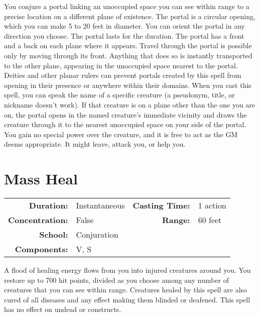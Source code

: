 \documentclass[a5paper, 12pt]{memoir}
\begin{document}
\vspace{1\baselineskip}\noindent You conjure a portal linking an unoccupied space you can see within range to a precise location on a different plane of existence. The portal is a circular opening, which you can make 5 to 20 feet in diameter. You can orient the portal in any direction you choose. The portal lasts for the duration. The portal has a front and a back on each plane where it appears. Travel through the portal is possible only by moving through its front. Anything that does so is instantly transported to the other plane, appearing in the unoccupied space nearest to the portal. Deities and other planar rulers can prevent portals created by this spell from opening in their presence or anywhere within their domains. When you cast this spell, you can speak the name of a specific creature (a pseudonym, title, or nickname doesn't work). If that creature is on a plane other than the one you are on, the portal opens in the named creature's immediate vicinity and draws the creature through it to the nearest unoccupied space on your side of the portal. You gain no special power over the creature, and it is free to act as the GM deems appropriate. It might leave, attack you, or help you.

\newpage
\section*{Mass Heal}

{
\small\centering\vspace{-6pt}
\begin{tabular}{rlrl}
\toprule

\textbf{Duration:} & Instantaneous &
\textbf{Casting Time:} & 1 action \\
\textbf{Concentration:} & False &
\textbf{Range:} & 60 feet \\
\textbf{School:} & Conjuration \\
\textbf{Components:} & \multicolumn{3}{p{0.7\textwidth}}{V, S}\\

\bottomrule
\end{tabular}
}

\vspace{1\baselineskip}\noindent A flood of healing energy flows from you into injured creatures around you. You restore up to 700 hit points, divided as you choose among any number of creatures that you can see within range. Creatures healed by this spell are also cured of all diseases and any effect making them blinded or deafened. This spell has no effect on undead or constructs.
\end{document}
